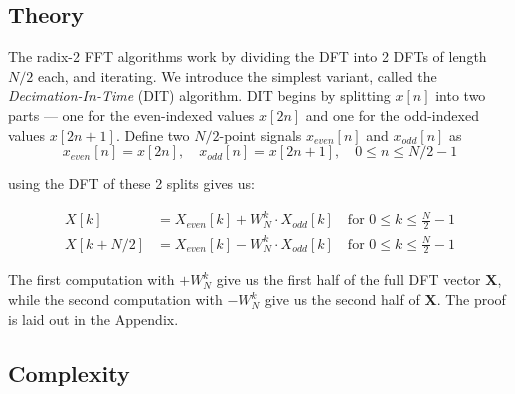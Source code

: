 \documentclass[8pt]{extarticle}
\begin{document}
\subsection{Theory}

The radix-2 FFT algorithms work by dividing the DFT into 2 DFTs of length $N/2$ each, and iterating. We introduce the simplest variant, called the \textit{Decimation-In-Time} (DIT) algorithm. DIT begins by splitting $x[n]$ into two parts --- one for the even-indexed values $x[2n]$ and one for the odd-indexed values $x[2n + 1]$. Define two $N/2$-point signals $x_{even}[n]$ and $x_{odd}[n]$ as
\begin{equation*}
x_{even}[n] = x[2n], \quad x_{odd}[n] = x[2n + 1], \quad 0 \leq n \leq N/2-1
\end{equation*}

using the DFT of these 2 splits gives us:

\begin{align}
X[k] &= X_{even}[k] + W_N^{k} \cdot X_{odd}[k] \quad \text{for } 0 \leq k \leq \frac{N}{2} - 1 \\
X[k + N/2] &= X_{even}[k] - W_N^{k} \cdot X_{odd}[k] \quad \text{for } 0 \leq k \leq \frac{N}{2} - 1
\label{eq:fft_final}
\end{align}

The first computation with $+W_N^k$ give us the first half of the full DFT vector $\mathbf{X}$, while the second computation with $-W_N^k$ give us the second half of $\mathbf{X}$. The proof is laid out in the Appendix.

\subsection{Complexity}
\end{document}
